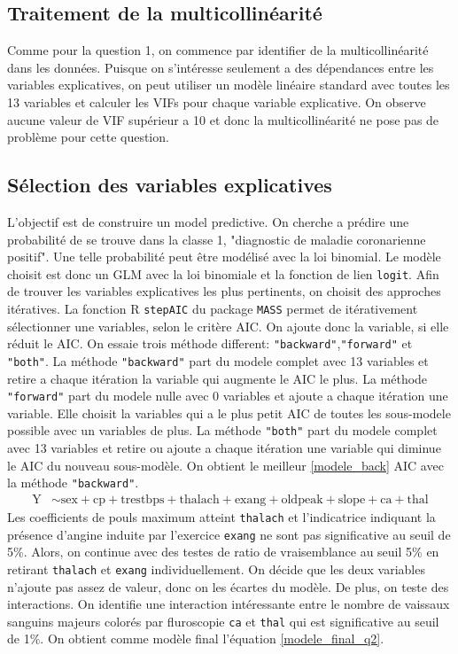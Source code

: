 \documentclass{article}
\begin{document}
	\subsection{Traitement de la multicollinéarité}
	
	Comme pour la question 1, on commence par identifier de la multicollinéarité dans les données. Puisque on s'intéresse seulement a des dépendances entre les variables explicatives, on peut utiliser un modèle linéaire standard avec toutes les 13 variables et calculer les VIFs pour chaque variable explicative. On observe aucune valeur de VIF supérieur a 10 et donc la multicollinéarité ne pose pas de problème pour cette question.
	


	\subsection{Sélection des variables explicatives}\label{q2_select}
	L'objectif est de construire un model predictive. On cherche a prédire une probabilité de se trouve dans la classe 1, "diagnostic de maladie coronarienne positif". Une telle probabilité  peut être modélisé avec la loi binomial. Le modèle choisit est donc un GLM avec la loi binomiale et la fonction de lien \texttt{logit}. 
	Afin de trouver les variables explicatives les plus pertinents, on choisit des approches itératives. La fonction R \texttt{stepAIC} du package \texttt{MASS} permet de itérativement sélectionner une variables, selon le critère AIC. On ajoute donc la variable, si elle réduit le AIC. On essaie trois méthode different: \texttt{"backward"},\texttt{"forward"} et \texttt{"both"}. La méthode \texttt{"backward"} part du modele complet avec 13 variables et retire a chaque itération la variable qui augmente le AIC le plus. La méthode \texttt{"forward"} part du modele nulle avec 0 variables et ajoute a chaque itération une variable. Elle choisit la variables qui a le plus petit AIC de toutes les sous-modele possible avec un variables de plus. La méthode \texttt{"both"} part du modele complet avec 13 variables et retire ou ajoute a chaque itération une variable qui diminue le AIC du nouveau sous-modèle. On obtient le meilleur \eqref{modele_back} AIC avec la méthode \texttt{"backward"}. 	
	\begin{align}\label{modele_back}
	\mathrm{Y} &\sim \mathrm{sex + cp + trestbps + thalach + exang + oldpeak + 
		slope + ca + thal}
	\end{align}
	Les coefficients de pouls maximum atteint \texttt{thalach} et l'indicatrice indiquant la présence d’angine induite par l’exercice \texttt{exang} ne sont pas significative au seuil de 5\%. Alors, on continue avec des testes de ratio de vraisemblance au seuil 5\% en retirant \texttt{thalach} et \texttt{exang} individuellement. On décide que les deux variables n'ajoute pas assez de valeur, donc on les écartes du modèle. De plus, on teste des interactions. On identifie une interaction intéressante entre le nombre de vaissaux sanguins majeurs colorés par fluroscopie \texttt{ca} et \texttt{thal} qui est significative au seuil de 1\%. On obtient comme modèle final l'équation \eqref{modele_final_q2}.
\end{document}
